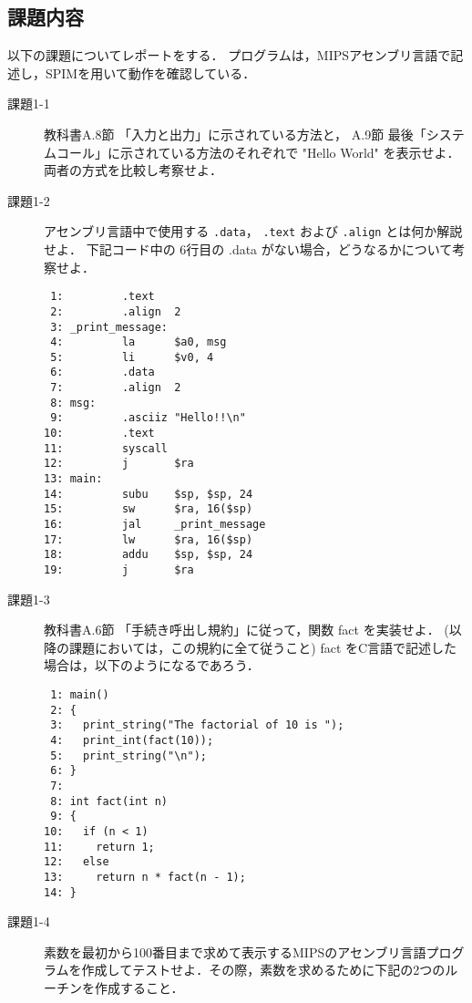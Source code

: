 \documentclass[a4j,11pt]{jarticle}
\begin{document}
\subsection{課題内容}\label{kadai}
以下の課題についてレポートをする． プログラムは，MIPSアセンブリ言語で記述し，SPIMを用いて動作を確認している．
\begin{description}
\item[課題1-1] 教科書A.8節 「入力と出力」に示されている方法と， A.9節 最後「システムコール」に示されている方法のそれぞれで "Hello World" を表示せよ．両者の方式を比較し考察せよ．
\item[課題1-2]アセンブリ言語中で使用する \verb|.data|， \verb|.text| および \verb|.align| とは何か解説せよ． 下記コード中の 6行目の .data がない場合，どうなるかについて考察せよ．
\begin{verbatim}
 1:         .text
 2:         .align  2
 3: _print_message:
 4:         la      $a0, msg
 5:         li      $v0, 4
 6:         .data
 7:         .align  2
 8: msg:
 9:         .asciiz "Hello!!\n"
10:         .text
11:         syscall
12:         j       $ra
13: main:
14:         subu    $sp, $sp, 24
15:         sw      $ra, 16($sp)
16:         jal     _print_message
17:         lw      $ra, 16($sp)
18:         addu    $sp, $sp, 24
19:         j       $ra
\end{verbatim}
\item[課題1-3]教科書A.6節 「手続き呼出し規約」に従って，関数 fact を実装せよ． (以降の課題においては，この規約に全て従うこと) fact をC言語で記述した場合は，以下のようになるであろう． 
\begin{verbatim}
 1: main()
 2: {
 3:   print_string("The factorial of 10 is ");
 4:   print_int(fact(10));
 5:   print_string("\n");
 6: }
 7: 
 8: int fact(int n)
 9: {
10:   if (n < 1)
11:     return 1;
12:   else
13:     return n * fact(n - 1);
14: }
\end{verbatim}
\item[課題1-4]素数を最初から100番目まで求めて表示するMIPSのアセンブリ言語プログラムを作成してテストせよ．その際，素数を求めるために下記の2つのルーチンを作成すること．


\end{description}
\end{document}
